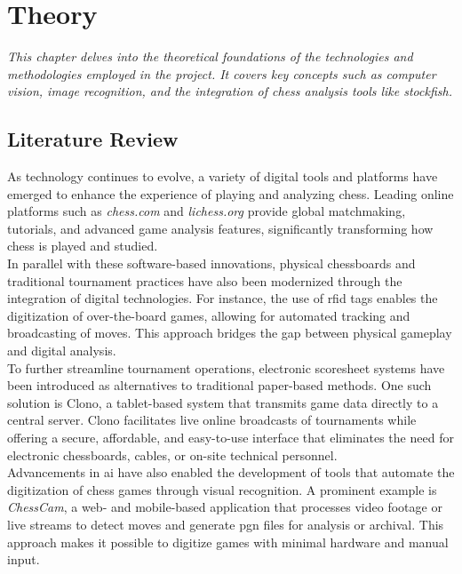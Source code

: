 \chapter{Theory}
\label{chp:theory}

\begin{center}
    \textit{This chapter delves into the theoretical foundations of the technologies and methodologies employed in the project. It covers key concepts such as computer vision, image recognition, and the integration of chess analysis tools like \Gls{stockfish}.}    
\end{center}

\section{Literature Review}
\label{sec:literature-review}

As technology continues to evolve, a variety of digital tools and platforms have emerged to enhance the experience of playing and analyzing chess. Leading online platforms such as \textit{chess.com} and \textit{lichess.org} provide global matchmaking, tutorials, and advanced game analysis features, significantly transforming how chess is played and studied. \\

In parallel with these software-based innovations, physical chessboards and traditional tournament practices have also been modernized through the integration of digital technologies. For instance, the use of \gls{rfid} tags enables the digitization of over-the-board games, allowing for automated tracking and broadcasting of moves. \cite{quora:shah} This approach bridges the gap between physical gameplay and digital analysis. \\

To further streamline tournament operations, electronic scoresheet systems have been introduced as alternatives to traditional paper-based methods. One such solution is Clono, a tablet-based system that transmits game data directly to a central server. Clono facilitates live online broadcasts of tournaments while offering a secure, affordable, and easy-to-use interface that eliminates the need for electronic chessboards, cables, or on-site technical personnel. \cite{clono} \\

Advancements in \gls{ai} have also enabled the development of tools that automate the digitization of chess games through visual recognition. A prominent example is \textit{ChessCam}, a web- and mobile-based application that processes video footage or live streams to detect moves and generate \gls{pgn} files for analysis or archival. This approach makes it possible to digitize games with minimal hardware and manual input. \cite{chess:chesscam, lichess:chesscam}

